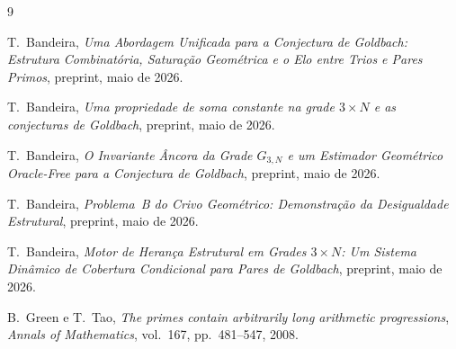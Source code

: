 \documentclass[12pt, a4paper]{article}
\theoremstyle{plain}
\theoremstyle{definition}
\theoremstyle{remark}
\begin{document}
	\begin{thebibliography}{9}
		
		T.~Bandeira,
		\textit{Uma Abordagem Unificada para a Conjectura de Goldbach:
			Estrutura Combinatória, Saturação Geométrica e o Elo entre Trios
			e Pares Primos}, preprint, maio de 2026.
		
		T.~Bandeira,
		\textit{Uma propriedade de soma constante na grade $3\times N$
			e as conjecturas de Goldbach}, preprint, maio de 2026.
		
		T.~Bandeira,
		\textit{O Invariante Âncora da Grade $G_{3,N}$ e um Estimador
			Geométrico Oracle-Free para a Conjectura de Goldbach},
		preprint, maio de 2026.
		
		T.~Bandeira,
		\textit{Problema~B do Crivo Geométrico: Demonstração da
			Desigualdade Estrutural}, preprint, maio de 2026.
		
		T.~Bandeira,
		\textit{Motor de Herança Estrutural em Grades $3\times N$:
			Um Sistema Dinâmico de Cobertura Condicional para Pares de
			Goldbach}, preprint, maio de 2026.
		
		B.~Green e T.~Tao,
		\textit{The primes contain arbitrarily long arithmetic
			progressions},
		\textit{Annals of Mathematics}, vol.~167, pp.~481--547, 2008.
		
	\end{thebibliography}
	
\end{document}
